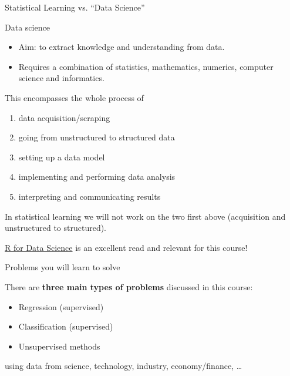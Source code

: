 \documentclass[10pt,ignorenonframetext,]{beamer}
\providecommand{\tightlist}{%
  \setlength{\itemsep}{0pt}\setlength{\parskip}{0pt}}
\begin{document}
\begin{frame}{Statistical Learning vs. ``Data Science''}
\protect\hypertarget{statistical-learning-vs.-data-science}{}

Data science

\begin{itemize}
\item
  Aim: to extract knowledge and understanding from data. \vspace{2mm}
\item
  Requires a combination of statistics, mathematics, numerics, computer
  science and informatics.
\end{itemize}

This encompasses the whole process of

\begin{enumerate}
\tightlist
\item
  data acquisition/scraping
\item
  going from unstructured to structured data
\item
  setting up a data model
\item
  implementing and performing data analysis
\item
  interpreting and communicating results
\end{enumerate}

In statistical learning we will not work on the two first above
(acquisition and unstructured to structured).

\href{http://r4ds.had.co.nz/}{R for Data Science} is an excellent read
and relevant for this course!

\end{frame}

\begin{frame}{Problems you will learn to solve}
\protect\hypertarget{problems-you-will-learn-to-solve}{}

There are \textbf{three main types of problems} discussed in this
course:

\begin{itemize}
\item
  Regression (supervised)
\item
  Classification (supervised)
\item
  Unsupervised methods
\end{itemize}

using data from science, technology, industry, economy/finance, \ldots{}

\end{frame}
\end{document}
